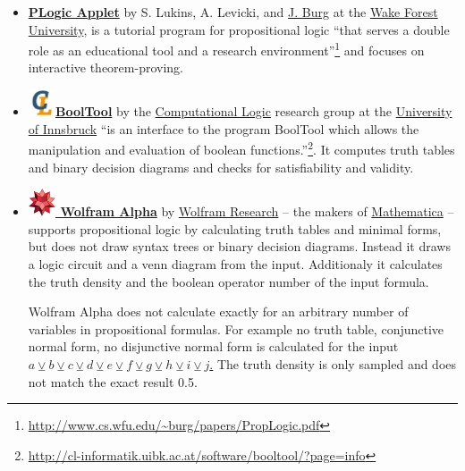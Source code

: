 \begin{itemize}
\item 
\href{http://www.cs.wfu.edu/~burg/JavaPackages/indexswingnet.html}{\bf PLogic Applet} 
by S. Lukins, A. Levicki, and 
\href{http://www.cs.wfu.edu/~burg}{J. Burg} at the
\href{http://www.cs.wfu.edu}{Wake Forest University}, is a
tutorial program for propositional logic 
“that serves a double role as an educational tool and a research environment”\footnote {
\url{http://www.cs.wfu.edu/~burg/papers/PropLogic.pdf}} and focuses 
 on interactive theorem-proving.

\item
\href{http://cl-informatik.uibk.ac.at/software/booltool/}{\bf 
\includegraphics[width=0.8cm]{clshortlogo_new.pdf}BoolTool} 
by the 
\href{http://cl-informatik.uibk.ac.at/}{Computational Logic} 
research group at the 
\href{http://informatik.uibk.ac.at}{University of Innsbruck}
“is an interface to the program BoolTool which allows the manipulation and evaluation of boolean functions.”\footnote{
\url{http://cl-informatik.uibk.ac.at/software/booltool/?page=info}}. 
It computes truth tables and binary decision diagrams and checks for satisfiability and validity.

\item
\href{http://www.wolframalpha.com/input/?i=a+or+b+and+c}{\bf 
\includegraphics[width=0.8cm]{related/WolframAlpha.jpg} Wolfram Alpha} 
by 
\href{http://www.wolfram.com/}{Wolfram Research} – the makers of 
\href{http://www.wolfram.com/mathematica/}{Mathematica} – supports
propositional logic by calculating truth tables and minimal forms, 
but does not draw syntax trees or binary decision diagrams.
Instead it draws a logic circuit and a venn diagram from the input. 
Additionaly it calculates the truth density
and the boolean operator number of the input formula. 

Wolfram Alpha does not calculate exactly for an arbitrary number of variables in propositional formulas.
For example no truth table, conjunctive normal form, no disjunctive normal form is calculated
for the input
\href{http://www.wolframalpha.com/input/?i=a+xor+b+xor+c+xor+d+xor+e+xor+f+xor+g+xor+h+xor+i+xor+j}{
$a\veebar b\veebar c\veebar d\veebar e\veebar f\veebar g\veebar h\veebar i\veebar j$.}
The truth density is only sampled and does not match the exact result 0.5.
\end{itemize}

